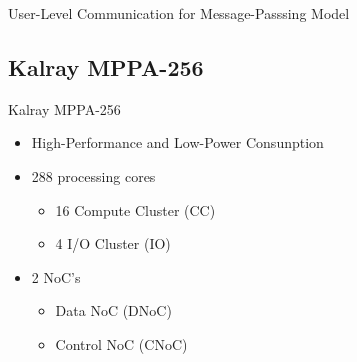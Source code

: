 		\begin{frame}[fragile]{User-Level Communication for Message-Passsing Model}
		\begin{overprint}
		\end{overprint}
		\end{frame}

	\subsection{Kalray MPPA-256}

		\begin{frame}[fragile]{Kalray MPPA-256}
			\begin{itemize}
				\item {High-Performance and Low-Power Consunption}
				\item {288 processing cores}
				\begin{itemize}
					\item {16 Compute Cluster (CC)}
					\item {4 I/O Cluster (IO)}
				\end{itemize}
				\item {2 NoC's}
				\begin{itemize}
					\item {Data NoC (DNoC)}
					\item {Control NoC (CNoC)}
				\end{itemize}
			\end{itemize}
		\end{frame}

